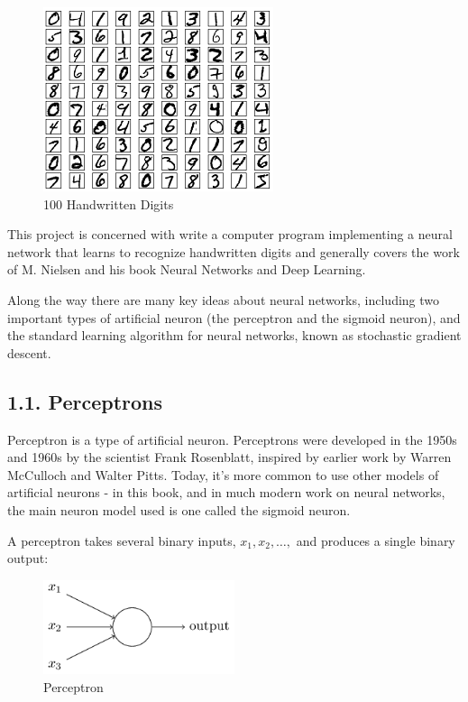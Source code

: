 \documentclass[12 pt]{article}
\begin{document}
\begin{figure}[htp]
\centering
\includegraphics{./figs/mnist_100_digits.png}
\caption{100 Handwritten Digits}
\end{figure}

This project is concerned with write a computer program implementing a
neural network that learns to recognize handwritten digits and generally
covers the work of M. Nielsen and his book Neural Networks and Deep Learning.\cite{ref1}

Along the way there are many key ideas about neural networks, including
two important types of artificial neuron (the perceptron and the sigmoid
neuron), and the standard learning algorithm for neural networks, known
as stochastic gradient descent.

\subsection{1.1. Perceptrons}\label{perceptrons}

Perceptron is a type of artificial neuron. Perceptrons were developed in
the 1950s and 1960s by the scientist Frank Rosenblatt, inspired by
earlier work by Warren McCulloch and Walter Pitts. Today, it's more
common to use other models of artificial neurons - in this book, and in
much modern work on neural networks, the main neuron model used is one
called the sigmoid neuron.

A perceptron takes several binary inputs, $ x_1, x_2, \ldots{}, $
and produces a single binary output:

\begin{figure}[htp]
\centering
\includegraphics[width=0.5\textwidth]{./figs/tikz0.png}
\caption{Perceptron}
\end{figure}
\end{document}
